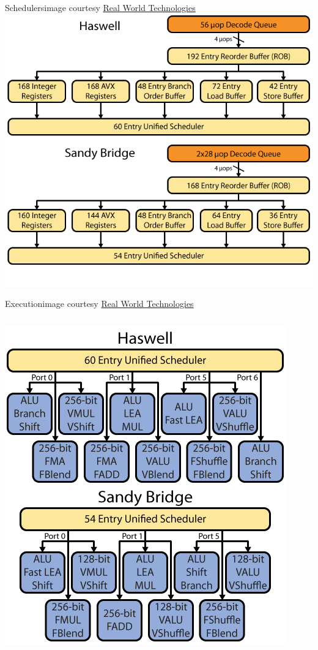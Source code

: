 \documentclass[mathserif,xcolor={dvipsnames,table}]{beamer}
\begin{document}
\begin{frame}{Schedulers\hfill\tiny{image courtesy \href{http://realworldtech.com}{Real World Technologies}}}
\includegraphics[scale=.42]{images/haswell-2.png}
\end{frame}

\begin{frame}{Execution\hfill\tiny{image courtesy \href{http://realworldtech.com}{Real World Technologies}}}
\begin{columns}
\begin{column}{.5\textwidth}
\hfill\includegraphics[scale=.45]{images/haswell-3.png}
\end{column}
\end{columns}
\end{frame}
\end{document}
